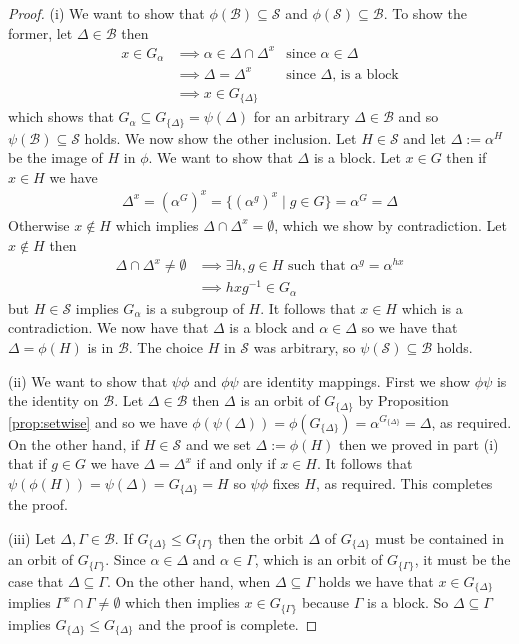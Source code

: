 \documentclass[]{article}
\theoremstyle{definition}
\begin{document}
\begin{proof} (i) We want to show that $\phi(\mathcal{B}) \subseteq \mathcal{S}$ and $\phi(\mathcal{S}) \subseteq \mathcal{B}$. To show the former, let $\Delta \in \mathcal{B}$ then
\begin{align*} 
x \in G_\alpha & \implies \alpha \in \Delta \cap \Delta^x & \mbox{since } \alpha \in \Delta \\
& \implies \Delta = \Delta^x & \mbox{since } \Delta \mbox{, is a block} \\
& \implies x \in G_{\{\Delta \}}
\end{align*}
which shows that $G_\alpha \subseteq G_{\{\Delta \}} = \psi(\Delta)$ for an arbitrary $\Delta \in \mathcal{B}$ and so $\psi(\mathcal{B}) \subseteq \mathcal{S}$ holds.
We now show the other inclusion. Let $H \in \mathcal{S}$ and let $\Delta := \alpha^H$ be the image of $H$ in $\phi$. We want to show that $\Delta$ is a block. Let $x \in G$ then if $x \in H$ we have
\begin{align*}
\Delta^x = (\alpha^G)^x = \{(\alpha^g)^x \; | \; g \in G \} = \alpha^G = \Delta
\end{align*}
Otherwise $x \notin H$ which implies $\Delta \cap \Delta^x = \emptyset$, which we show by contradiction. Let $x \notin H$ then 
\begin{align*}
\Delta \cap \Delta^x \neq \emptyset & \implies \exists h,g \in H \mbox{ such that } \alpha^{g} = \alpha^{hx} \\
& \implies hxg^{-1} \in G_\alpha
\end{align*}
but $H \in \mathcal{S}$ implies $G_\alpha$ is a subgroup of $H$. It follows that $x \in H$ which is a contradiction. We now have that $\Delta$ is a block and $\alpha \in \Delta$ so we have that $\Delta = \phi(H)$ is in $\mathcal{B}$. The choice $H$ in $\mathcal{S}$ was arbitrary, so $\psi(\mathcal{S}) \subseteq \mathcal{B}$ holds. 

(ii) We want to show that $\psi \phi$ and $\phi \psi$ are identity mappings. First we show $\phi\psi$ is the identity on $\mathcal{B}$. Let $\Delta \in \mathcal{B}$ then $\Delta$ is an orbit of $G_{\{\Delta \}}$ by Proposition \ref{prop:setwise} and so we have $\phi(\psi(\Delta))=\phi(G_{\{\Delta \}}) = \alpha^{G_{\{\Delta \}}} = \Delta$, as required. On the other hand, if $H \in \mathcal{S}$ and we set $\Delta := \phi(H)$ then we proved in part (i) that if $g \in G$ we have $\Delta = \Delta^x$ if and only if $x \in H$. It follows that $\psi(\phi(H))=\psi(\Delta)=G_{\{\Delta \}}=H$ so $\psi\phi$ fixes $H$, as required. This completes the proof.

(iii) Let $\Delta, \Gamma \in \mathcal{B}$. If $G_{\{\Delta \}} \leqslant G_{\{\Gamma \}}$ then the orbit $\Delta$ of $G_{\{\Delta \}}$ must be contained in an orbit of $G_{\{\Gamma \}}$. Since $\alpha \in \Delta$ and $\alpha \in \Gamma$, which is an orbit of $G_{\{\Gamma \}}$, it must be the case that $\Delta \subseteq \Gamma$. On the other hand, when $\Delta \subseteq \Gamma$ holds we have that $x \in G_{\{\Delta \}}$ implies $\Gamma^x \cap \Gamma \neq \emptyset$ which then implies $x \in G_{\{\Gamma \}}$ because $\Gamma$ is a block. So $\Delta \subseteq \Gamma$ implies $G_{\{\Delta \}} \leqslant G_{\{\Delta \}}$ and the proof is complete.
\end{proof}
\end{document}
